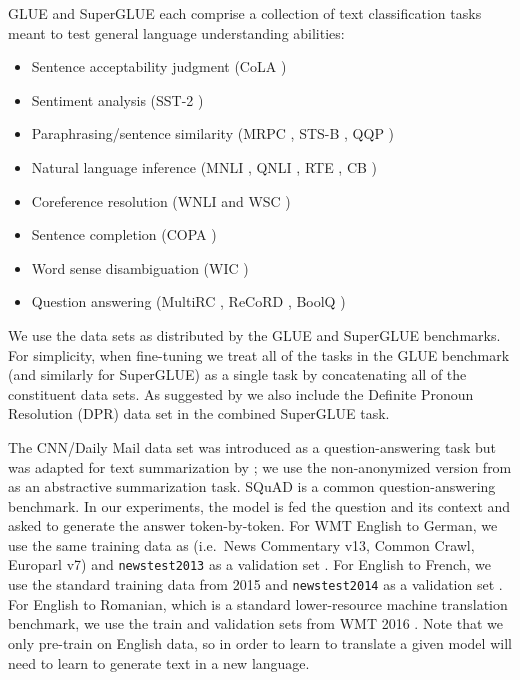 \documentclass[twoside,11pt]{article}
\begin{document}
GLUE \citep{wang2018glue} and SuperGLUE \citep{wang2019superglue} each comprise a collection of text classification tasks meant to test general language understanding abilities:
\begin{itemize}
  \item Sentence acceptability judgment (CoLA \citep{warstadt2018neural})
  \item Sentiment analysis (SST-2 \citep{socher2013recursive})
  \item Paraphrasing/sentence similarity (MRPC \citep{dolan2005automatically}, STS-B \citep{cer2017semeval}, QQP \citep{shankar2017first})
  \item Natural language inference (MNLI \citep{williams2017broad}, QNLI \citep{rajpurkar2016squad}, RTE \citep{dagan2005pascal}, CB \citep{de2019commitmentbank})
  \item Coreference resolution (WNLI and WSC \citep{levesque2012winograd})
  \item Sentence completion (COPA \citep{roemmele2011choice})
  \item Word sense disambiguation (WIC \citep{pilehvar2018wic})
  \item Question answering (MultiRC \citep{khashabi2018looking}, ReCoRD \citep{zhang2018record}, BoolQ \citep{clark2019boolq})
\end{itemize}
We use the data sets as distributed by the GLUE and SuperGLUE benchmarks.
For simplicity, when fine-tuning we treat all of the tasks in the GLUE benchmark (and similarly for SuperGLUE) as a single task by concatenating all of the constituent data sets.
As suggested by \cite{kocijan2019surprisingly} we also include the Definite Pronoun Resolution (DPR) data set \citep{rahman2012resolving} in the combined SuperGLUE task.

The CNN/Daily Mail \citep{hermann2015teaching} data set was introduced as a question-answering task but was adapted for text summarization by  \citet{nallapati2016abstractive}; we use the non-anonymized version from \citet{see2017get} as an abstractive summarization task.
SQuAD \citep{rajpurkar2016squad} is a common question-answering benchmark.
In our experiments, the model is fed the question and its context and asked to generate the answer token-by-token.
For WMT English to German, we use the same training data as \citep{vaswani2017attention} (i.e.\ News Commentary v13, Common Crawl, Europarl v7) and \texttt{newstest2013} as a validation set \citep{bojar2014findings}.
For English to French, we use the standard training data from 2015 and \texttt{newstest2014} as a validation set \citep{bojar2015findings}.
For English to Romanian, which is a standard lower-resource machine translation benchmark, we use the train and validation sets from WMT 2016 \citep{bojar2016findings}.
Note that we only pre-train on English data, so in order to learn to translate a given model will need to learn to generate text in a new language.
\end{document}
